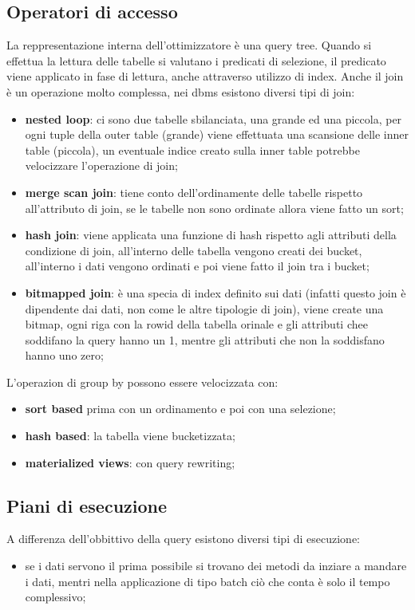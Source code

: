 \documentclass[12pt]{article}
\begin{document}
\subsection{Operatori di accesso}
La reppresentazione interna dell'ottimizzatore \`e una query tree. Quando si effettua la lettura delle tabelle si valutano i predicati di selezione, il predicato viene applicato in fase di lettura, anche attraverso utilizzo di index. Anche il join \`e un operazione molto complessa, nei dbms esistono diversi tipi di join:
\begin{itemize}
    \item \textbf{nested loop}: ci sono due tabelle sbilanciata, una grande ed una piccola, per ogni tuple della outer table (grande) viene effettuata una scansione delle inner table (piccola), un eventuale indice creato sulla inner table potrebbe velocizzare l'operazione di join;
    \item \textbf{merge scan join}: tiene conto dell'ordinamente delle tabelle rispetto all'attributo di join, se le tabelle non sono ordinate allora viene fatto un sort;
    \item \textbf{hash join}: viene applicata una funzione di hash rispetto agli attributi della condizione di join, all'interno delle tabella vengono creati dei bucket, all'interno i dati vengono ordinati e poi viene fatto il join tra i bucket;
    \item \textbf{bitmapped join}: \`e una specia di index definito sui dati (infatti questo join \`e dipendente dai dati, non come le altre tipologie di join), viene create una bitmap, ogni riga con la rowid della tabella orinale e gli attributi chee soddifano la query hanno un 1, mentre gli attributi che non la soddisfano hanno uno zero;
\end{itemize}


L'operazion di group by possono essere velocizzata con:
\begin{itemize}
    \item \textbf{sort based} prima con un ordinamento e poi con una selezione;
    \item \textbf{hash based}: la tabella viene bucketizzata;
    \item \textbf{materialized views}: con query rewriting;
\end{itemize}



\subsection{Piani di esecuzione}
A differenza dell'obbittivo della query esistono diversi tipi di esecuzione:
\begin{itemize}
    \item se i dati servono il prima possibile si trovano dei metodi da inziare a mandare i dati, mentri nella applicazione di tipo batch ci\`o che conta \`e solo il tempo complessivo;
\end{itemize}
\end{document}
